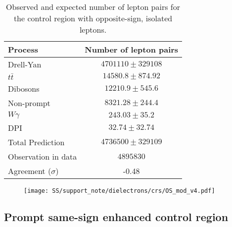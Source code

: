 \begin{table}[htbp]
\caption{Observed and expected number of lepton pairs for the control region with opposite-sign, isolated leptons.} %
\begin{center}
\begin{tabular}{l|c}

Process & Number of lepton pairs \\\hline\hline
        Drell-Yan	& $ 4701110 \pm 329108 $	\\[+0.05in]
	$t\bar{t}$	& $ 14580.8 \pm 874.92 $	\\[+0.05in]
	Dibosons	& $ 12210.9 \pm 545.6 $	\\[+0.05in]
	Non-prompt	& $ 8321.28 \pm 244.4 $	\\[+0.05in]
	$W\gamma$	& $ 243.03 \pm 35.2 $	\\[+0.05in]
	DPI	& $ 32.74 \pm 32.74 $	\\[+0.05in]
	\hline
	Total Prediction	& $ 4736500 \pm 329109 $	\\[+0.05in]
	\hline
	Observation in data	& $ 4895830 $	\\[+0.05in]
	\hline
	Agreement ($\sigma$) & -0.48 \\[+0.05in]

\hline  
\end{tabular}
\end{center}
\label{tab:dilep_isoOS}
\end{table}

\begin{figure}[h]
\begin{center}
\texttt{[image: SS/support\_note/dielectrons/crs/OS\_mod\_v4.pdf]}
\caption{\toDo}
\label{fig:OS_CR}
\end{center}
\end{figure} 



\subsection{Prompt same-sign enhanced control region}


